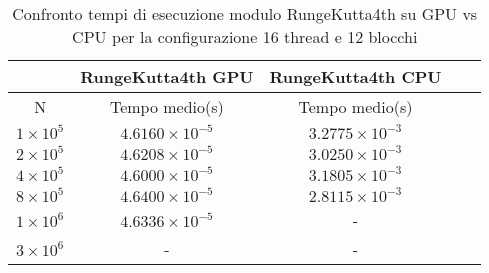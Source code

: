 \begin{table}[ht!]
    \begin{center}
        \renewcommand{\arraystretch}{1.5}
        \begin{adjustbox}{width=.51\textwidth}
            \begin{tabular}{ |c|c|c|c|c| }
                \hline
                \multicolumn{1}{|c}{} & \multicolumn{1}{|c}{RungeKutta4th GPU} & \multicolumn{1}{|c|}{RungeKutta4th CPU} \\
                \hline
                N & Tempo medio(s) & Tempo medio(s) \\
                \hline 
                $1 \times 10^5$ & $4.6160 \times 10^{-5}$ & $3.2775 \times 10^{-3}$ \\
                \hline 
                $2 \times 10^5$ & $4.6208 \times 10^{-5}$ & $3.0250 \times 10^{-3}$ \\
                \hline 
                $4 \times 10^5$ & $4.6000 \times 10^{-5}$ & $3.1805 \times 10^{-3}$ \\
                \hline 
                $8 \times 10^5$ & $4.6400 \times 10^{-5}$ & $2.8115 \times 10^{-3}$ \\ 
                \hline 
                $1 \times 10^6$ & $4.6336 \times 10^{-5}$ & - \\
                \hline 
                $3 \times 10^6$ & - & - \\
                \hline
            \end{tabular}
        \end{adjustbox}
    \end{center}
    \caption{Confronto tempi di esecuzione modulo RungeKutta4th su GPU vs CPU per la configurazione 16 thread e 12 blocchi}
    \label{tab:rk4_kernel_table_16x12}
\end{table}

